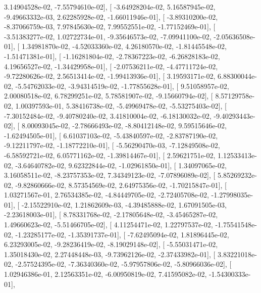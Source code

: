 \documentclass{article}
\begin{document}
          3.14904528e-02,  -7.55794610e-02],
       [ -3.64928204e-02,   5.16587945e-02,  -9.49663332e-03,
          2.62285928e-02,  -1.66011946e-01],
       [ -3.89310200e-02,  -8.37066759e-03,   7.97845630e-02,
          7.99552551e-02,  -1.77152469e-01],
       [ -3.51383277e-02,   1.02722734e-01,  -9.35646573e-02,
         -7.09941100e-02,  -2.05636508e-01],
       [  1.34981870e-02,  -4.52033360e-02,   4.26180570e-02,
         -1.81445548e-02,  -1.51471381e-01],
       [ -1.16281804e-02,  -2.78367223e-02,  -6.26828183e-02,
          4.19656527e-02,  -1.34429958e-01],
       [ -2.07536211e-02,  -4.47711724e-02,  -9.72280626e-02,
          2.56513414e-02,  -1.99413936e-01],
       [  3.19593171e-02,   6.88300044e-02,  -5.54762033e-02,
         -3.94314519e-02,  -1.77855628e-01],
       [  9.51058957e-02,   2.00080518e-02,   6.78299251e-02,
          5.78581907e-02,  -9.15660794e-02],
       [  8.57129758e-02,   1.00397593e-01,   5.38416738e-02,
         -5.49969478e-02,  -5.53275403e-02],
       [ -7.30152484e-02,  -9.40780240e-02,   3.41810004e-02,
         -6.18130032e-02,  -9.40293443e-02],
       [  8.00093045e-02,  -2.78666493e-02,  -8.80412148e-02,
          9.59515646e-02,  -1.62494505e-01],
       [  6.61037103e-02,  -5.43840597e-02,  -2.83787190e-02,
         -9.12211797e-02,  -1.18772210e-01],
       [ -5.56290470e-03,  -7.12849508e-02,  -6.58592721e-02,
          6.05771162e-02,  -1.39814467e-01],
       [  2.59621751e-02,   1.12533413e-02,  -3.64640782e-02,
          9.62322844e-02,  -1.02961850e-01],
       [  1.34097065e-02,   3.16058511e-02,  -8.23757353e-02,
          7.34349123e-02,  -7.07896089e-02],
       [  5.85269232e-02,  -9.82860666e-02,   8.57354569e-02,
          2.64975356e-02,  -1.70215847e-01],
       [  1.03271567e-01,   2.76534385e-02,  -4.84449705e-02,
         -2.72405708e-02,  -1.27998035e-01],
       [ -2.15522910e-02,   1.21862609e-03,  -4.39485888e-02,
          1.67091505e-03,  -2.23618003e-01],
       [  8.78331768e-02,  -2.17805648e-02,  -3.45465287e-02,
          1.49660623e-02,  -5.51466705e-02],
       [  4.11254471e-02,   1.22797537e-02,  -1.75541548e-02,
         -1.23285177e-02,  -1.35391737e-01],
       [ -7.62495094e-02,   1.81896445e-02,   6.23293005e-02,
         -9.28236419e-02,  -8.19029148e-02],
       [ -5.55031471e-02,   1.35018430e-02,   2.27448448e-03,
         -9.73962126e-02,  -2.37433982e-01],
       [  3.83221018e-02,  -2.57524395e-02,  -7.36340360e-02,
         -5.97957806e-02,  -5.80966036e-02],
       [  1.02946386e-01,   2.12563351e-02,  -6.00950819e-02,
          7.41595082e-02,  -1.54300333e-01],
\end{document}
